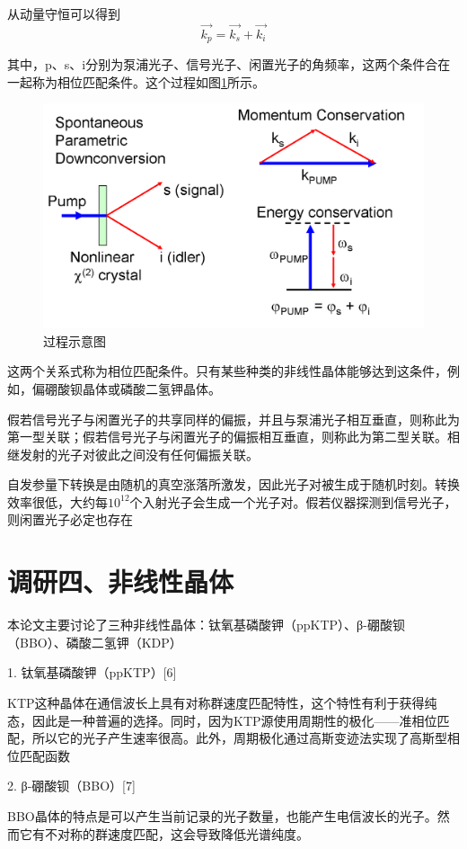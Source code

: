 从动量守恒可以得到\[\vec{k_p}=\vec{k_s}+\vec{k_i}\]

其中，p、s、i分别为泵浦光子、信号光子、闲置光子的角频率，这两个条件合在一起称为相位匹配条件。这个过程如图\ref{fig:SPDC}所示。

\begin{figure}[ht]
	\centering
	\includegraphics[scale=0.3]{pic/SPDC}
	\caption{过程示意图}
	\label{fig:SPDC}
\end{figure}

这两个关系式称为相位匹配条件。只有某些种类的非线性晶体能够达到这条件，例如，偏硼酸钡晶体或磷酸二氢钾晶体。

假若信号光子与闲置光子的共享同样的偏振，并且与泵浦光子相互垂直，则称此为第一型关联；假若信号光子与闲置光子的偏振相互垂直，则称此为第二型关联。相继发射的光子对彼此之间没有任何偏振关联。

自发参量下转换是由随机的真空涨落所激发，因此光子对被生成于随机时刻。转换效率很低，大约每$10^{12}$个入射光子会生成一个光子对。假若仪器探测到信号光子，则闲置光子必定也存在

\section{调研四、非线性晶体}
本论文主要讨论了三种非线性晶体：钛氧基磷酸钾（ppKTP）、β-硼酸钡（BBO）、磷酸二氢钾（KDP）

1.	钛氧基磷酸钾（ppKTP）[6]

KTP这种晶体在通信波长上具有对称群速度匹配特性，这个特性有利于获得纯态，因此是一种普遍的选择。同时，因为KTP源使用周期性的极化——准相位匹配，所以它的光子产生速率很高。此外，周期极化通过高斯变迹法实现了高斯型相位匹配函数

2.	β-硼酸钡（BBO）[7]

BBO晶体的特点是可以产生当前记录的光子数量，也能产生电信波长的光子。然而它有不对称的群速度匹配，这会导致降低光谱纯度。

